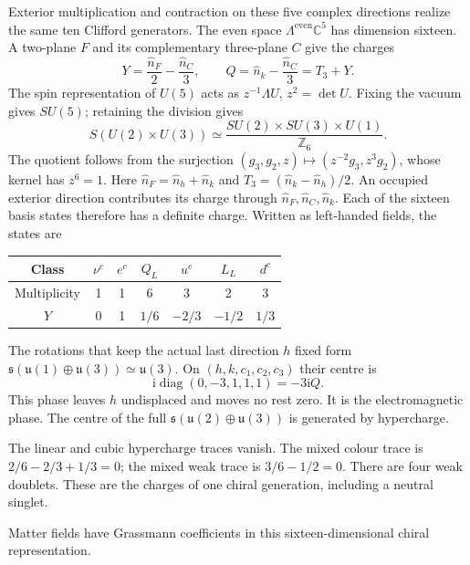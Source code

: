 \documentclass[aps,prx,onecolumn,10pt,notitlepage,nofootinbib,longbibliography]{revtex4-2}
\numberwithin{equation}{section}
\numberwithin{table}{section}
\newcommand{\CC}{\mathbb C}
\newcommand{\diag}{\operatorname{diag}}
\newcommand{\ii}{\mathrm i}
\begin{document}
Exterior multiplication and contraction on these five complex directions realize the same ten Clifford generators. The even space $\Lambda^{\mathrm{even}}\CC^5$ has dimension sixteen. A two-plane $F$ and its complementary three-plane $C$ give the charges
\begin{equation}
 Y=\frac{\widehat n_F}{2}-\frac{\widehat n_C}{3},\qquad
 Q=\widehat n_k-\frac{\widehat n_C}{3}=T_3+Y.
\end{equation}
The spin representation of $U(5)$ acts as $z^{-1}\Lambda U$, $z^2=\det U$. Fixing the vacuum gives $SU(5)$; retaining the division gives
\begin{equation}
 S(U(2)\times U(3))\simeq
 \frac{SU(2)\times SU(3)\times U(1)}{\mathbb Z_6}.
\end{equation}
The quotient follows from the surjection $(g_3,g_2,z)\mapsto(z^{-2}g_3,z^3g_2)$, whose kernel has $z^6=1$. Here $\widehat n_F=\widehat n_h+\widehat n_k$ and $T_3=(\widehat n_k-\widehat n_h)/2$. An occupied exterior direction contributes its charge through $\widehat n_F,\widehat n_C,\widehat n_k$. Each of the sixteen basis states therefore has a definite charge. Written as left-handed fields, the states are
\begin{center}
\begin{tabular}{ccccccc}
\toprule
Class&$\nu^c$&$e^c$&$Q_L$&$u^c$&$L_L$&$d^c$\\\midrule
Multiplicity&1&1&6&3&2&3\\
$Y$&0&1&$1/6$&$-2/3$&$-1/2$&$1/3$\\\bottomrule
\end{tabular}
\end{center}
The rotations that keep the actual last direction $h$ fixed form $\mathfrak s(\mathfrak u(1)\oplus\mathfrak u(3))\simeq\mathfrak u(3)$. On $(h,k,c_1,c_2,c_3)$ their centre is
\begin{equation}
 \ii\diag(0,-3,1,1,1)=-3\ii Q.
 \label{eq:electromagneticcentre}
\end{equation}
This phase leaves $h$ undisplaced and moves no rest zero. It is the electromagnetic phase. The centre of the full $\mathfrak s(\mathfrak u(2)\oplus\mathfrak u(3))$ is generated by hypercharge.

The linear and cubic hypercharge traces vanish. The mixed colour trace is $2/6-2/3+1/3=0$; the mixed weak trace is $3/6-1/2=0$. There are four weak doublets. These are the charges of one chiral generation, including a neutral singlet.

Matter fields have Grassmann coefficients in this sixteen-dimensional chiral representation.
\end{document}
